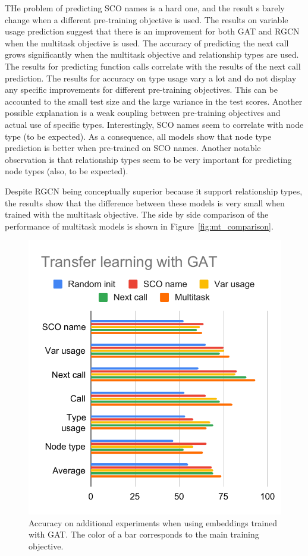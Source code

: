 \documentclass[a4paper,twoside]{article}
\begin{document}
THe problem of predicting SCO names is a hard one, and the result s barely change when a different pre-training objective is used. The results on variable usage prediction suggest that there is an improvement for both GAT and RGCN when the multitask objective is used. The accuracy of predicting the next call grows significantly when the multitask objective and relationship types are used. The results for predicting function calls correlate with the results of the next call prediction. The results for accuracy on type usage vary a lot and do not display any specific improvements for different pre-training objectives. This can be accounted to the small test size and the large variance in the test scores. Another possible explanation is a weak coupling between pre-training objectives and actual use of specific types. Interestingly, SCO names seem to correlate with node type (to be expected). As a consequence, all models show that node type prediction is better when pre-trained on SCO names. Another notable observation is that relationship types seem to be very important for predicting node types (also, to be expected).

Despite RGCN being conceptually superior because it support relationship types, the results show that the difference between these models is very small when trained with the multitask objective. The side by side comparison of the performance of multitask models is shown in Figure~\ref{fig:mt_comparison}. 

\begin{figure}[]
    \centering
    \includegraphics{transfer_gat.pdf}
    \caption{Accuracy on additional experiments when using embeddings trained with GAT\@. The color of a bar corresponds to the main training objective.}\label{fig:transfer_gat}
\end{figure}
\end{document}
